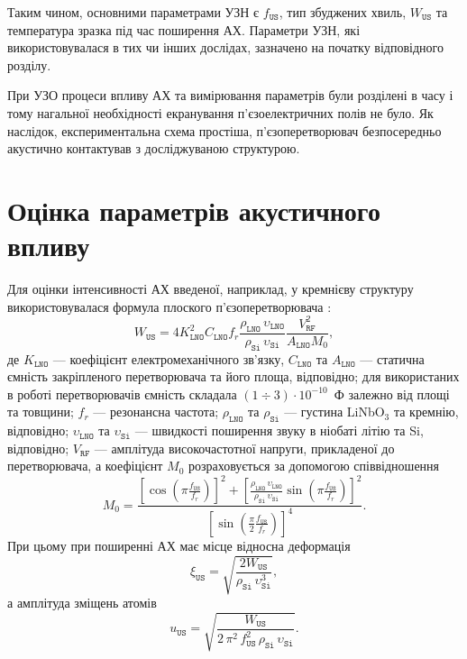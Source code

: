 Таким чином, основними параметрами УЗН є $f_\mathtt{US}$, тип збуджених хвиль, $W_\mathtt{US}$ та температура зразка під час поширення АХ.
Параметри УЗН, які використовувалася в тих чи інших дослідах, зазначено на початку відповідного розділу.

При УЗО процеси впливу АХ та вимірювання параметрів були розділені в часу і тому нагальної необхідності екранування п'єзоелектричних полів не було.
Як наслідок, експериментальна схема простіша, п'єзоперетворювач безпосередньо акустично контактував з досліджуваною структурою.


\section{Оцінка параметрів акустичного впливу\label{subLowT}}
Для оцінки інтенсивності АХ введеної, наприклад, у кремнієву структуру використовувалася формула плоского п’єзоперетворювача \cite{WusBook}:
 \begin{equation}
 \label{eqWus}
 W_\mathtt{US}=4K_\mathtt{LNO}^2C_\mathtt{LNO}f_r\frac{\rho_\mathtt{LNO}\,\upsilon_\mathtt{LNO}}{\rho_\mathtt{Si}\,\upsilon_\mathtt{Si}}\frac{V_\mathtt{RF}^2}{A_\mathtt{LNO}M_0},
 \end{equation}
де
$K_\mathtt{LNO}$ --- коефіцієнт електромеханічного зв'язку,
$C_\mathtt{LNO}$ та $A_\mathtt{LNO}$ --- статична ємність закріпленого перетворювача та його площа, відповідно;
для використаних в роботі перетворювачів ємність складала $(1\div3)\cdot10^{-10}$~Ф залежно від площі та товщини;
$f_r$ --- резонансна частота;
$\rho_\mathtt{LNO}$ та $\rho_\mathtt{Si}$ --- густина LiNbO$_3$ та кремнію, відповідно;
$\upsilon_\mathtt{LNO}$ та $\upsilon_\mathtt{Si}$ --- швидкості поширення звуку в ніобаті літію та Si, відповідно;
$V_\mathtt{RF}$ --- амплітуда високочастотної напруги, прикладеної до перетворювача,
а коефіцієнт $M_0$ розраховується за допомогою співвідношення
 \begin{equation}
 \label{eqM0}
 M_0=\frac{\left[\cos\left(\pi\frac{f_\mathtt{US}}{f_r}\right)\right]^2+\left[\frac{\rho_\mathtt{LNO}\,\upsilon_\mathtt{LNO}}{\rho_\mathtt{Si}\,\upsilon_\mathtt{Si}}\sin\left(\pi\frac{f_\mathtt{US}}{f_r}\right)\right]^2}
 {\left[\sin\left(\frac{\pi}{2}\frac{f_\mathtt{US}}{f_r}\right)\right]^4}.
 \end{equation}
При цьому при поширенні АХ має місце відносна деформація
 \begin{equation}
 \label{eqDefUS}
 \xi_{\mathtt{US}}=\sqrt{\frac{2W_\mathtt{US}}{\rho_\mathtt{Si}\,\upsilon_\mathtt{Si}^3}},
 \end{equation}
а амплітуда зміщень атомів
 \begin{equation}
 \label{eqAmpUS}
 u_{\mathtt{US}}=\sqrt{\frac{W_\mathtt{US}}{2\,\pi^2\,f_\mathtt{US}^2\,\rho_\mathtt{Si}\,\upsilon_\mathtt{Si}}}.
 \end{equation}

